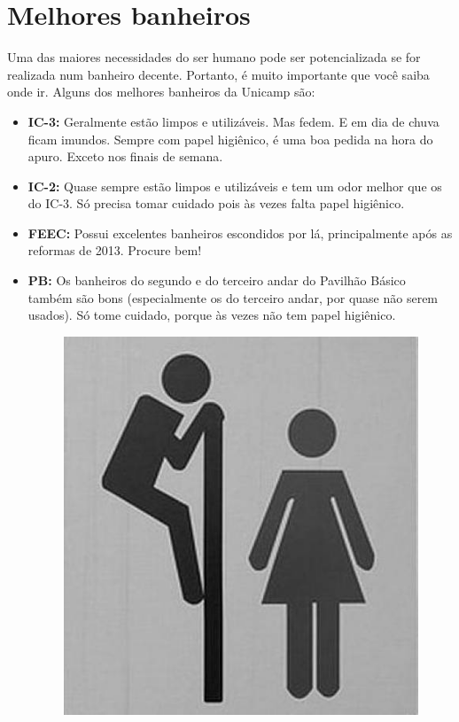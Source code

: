 
\section{Melhores banheiros}

Uma das maiores necessidades do ser humano pode ser potencializada se for
realizada num banheiro decente. Portanto, é muito importante que você saiba onde
ir. Alguns dos melhores banheiros da Unicamp são:

\begin{itemize}
    \item  \textbf{IC-3:} Geralmente estão limpos e utilizáveis. Mas fedem. E em 
        dia de chuva ficam imundos. Sempre com papel higiênico, é uma boa pedida 
        na hora do apuro. Exceto nos finais de semana.

    \item  \textbf{IC-2:} Quase sempre estão limpos e utilizáveis e tem um odor
        melhor que os do IC-3. Só precisa tomar cuidado pois às vezes falta
        papel higiênico.

    \item  \textbf{FEEC:} Possui excelentes banheiros escondidos por lá,
        principalmente após as reformas de 2013. Procure bem!

    \item  \textbf{PB:} Os banheiros do segundo e do terceiro andar do Pavilhão
        Básico também são bons (especialmente os do terceiro andar, por quase
        não serem usados). Só tome cuidado, porque às vezes não tem papel
        higiênico.

        \begin{figure}[h!]
            \centering
            \includegraphics[scale=0.50, keepaspectratio=true]{img/imgs/12-melhores_banheiros/banheiro.jpg}
        \end{figure}


\end{itemize}
